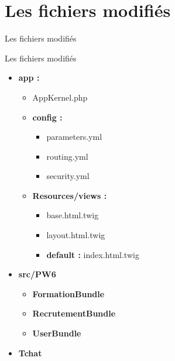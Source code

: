 \documentclass{beamer}
\begin{document}
\section{Les fichiers modifiés}
\begin{frame}
	\begin{center}
		{\Huge Les fichiers modifiés}
	\end{center}
\end{frame}
\begin{frame}{Les fichiers modifiés}
	 \begin{itemize}
		 \item<1-> \textbf{app : }
		  	\begin{itemize}
		  		\item<2-> AppKernel.php
		  		\item<3-> \textbf{config : }
		  		\begin{itemize}
		  			\item<4-> parameters.yml
		  			\item<4-> routing.yml
		  			\item<4-> security.yml
		  		\end{itemize}
		  		\item<5-> \textbf{Resources/views : }
		  			\begin{itemize}
		  				\item<6-> base.html.twig
		  				\item<6-> layout.html.twig
		  				\item<6-> \textbf{default : } index.html.twig
		  			\end{itemize}
		  	\end{itemize}
 		 \item<7-> \textbf{src/PW6}
 		 	\begin{itemize}
		  		\item<8-> \textbf{FormationBundle}
		  		\item<9-> \textbf{RecrutementBundle}
		  		\item<10-> \textbf{UserBundle}
		  	\end{itemize}
		  \item<11-> \textbf{Tchat}
	\end{itemize}
\end{frame}
\end{document}
